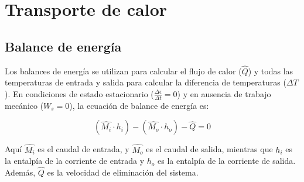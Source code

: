 \documentclass{AsignaturaResumen}
\begin{document}
    \chapter{Transporte de calor}
\fi




\section{Balance de energía}

Los balances de energía se utilizan para calcular el flujo de calor ($\hat{Q}$) y todas las temperaturas de entrada y salida para calcular la diferencia de temperaturas ($\Delta T$). En condiciones de estado estacionario ($\frac{\Delta\epsilon}{\Delta t} = 0$) y en ausencia de trabajo mecánico ($W_{s} = 0$), la ecuación de balance de energía es:

\begin{equation}
    (\hat{M_{i}} \cdot h_{i}) - (\hat{M_{o}} \cdot h_{o}) - \hat{Q} = 0
\end{equation}

Aquí $\hat{M_{i}}$ es el caudal de entrada, y $\hat{M_{o}}$ es el caudal de salida, mientras que $h_{i}$ es la entalpía de la corriente de entrada y $h_{o}$ es la entalpía de la corriente de salida. Además, $\hat{Q}$ es la velocidad de eliminación del sistema. 
\end{document}
